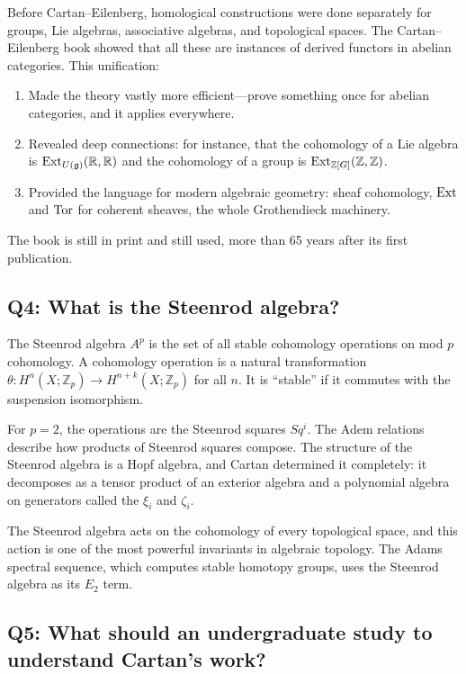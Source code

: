 Before Cartan--Eilenberg, homological constructions were done separately for groups, Lie algebras, associative algebras, and topological spaces. The Cartan--Eilenberg book showed that all these are instances of derived functors in abelian categories. This unification:

\begin{enumerate}
\item Made the theory vastly more efficient---prove something once for abelian categories, and it applies everywhere.
\item Revealed deep connections: for instance, that the cohomology of a Lie algebra is $\operatorname{Ext}_{U(\mathfrak{g})}(\mathbb{R}, \mathbb{R})$ and the cohomology of a group is $\operatorname{Ext}_{\mathbb{Z}[G]}(\mathbb{Z}, \mathbb{Z})$.
\item Provided the language for modern algebraic geometry: sheaf cohomology, $\operatorname{Ext}$ and $\operatorname{Tor}$ for coherent sheaves, the whole Grothendieck machinery.
\end{enumerate}

The book is still in print and still used, more than 65 years after its first publication.

\subsection*{Q4: What is the Steenrod algebra?}

The Steenrod algebra $A^p$ is the set of all stable cohomology operations on mod $p$ cohomology. A cohomology operation is a natural transformation $\theta: H^n(X; \mathbb{Z}_p) \to H^{n+k}(X; \mathbb{Z}_p)$ for all $n$. It is ``stable'' if it commutes with the suspension isomorphism.

For $p=2$, the operations are the Steenrod squares $Sq^i$. The Adem relations describe how products of Steenrod squares compose. The structure of the Steenrod algebra is a Hopf algebra, and Cartan determined it completely: it decomposes as a tensor product of an exterior algebra and a polynomial algebra on generators called the $\xi_i$ and $\zeta_i$.

The Steenrod algebra acts on the cohomology of every topological space, and this action is one of the most powerful invariants in algebraic topology. The Adams spectral sequence, which computes stable homotopy groups, uses the Steenrod algebra as its $E_2$ term.

\subsection*{Q5: What should an undergraduate study to understand Cartan's work?}

